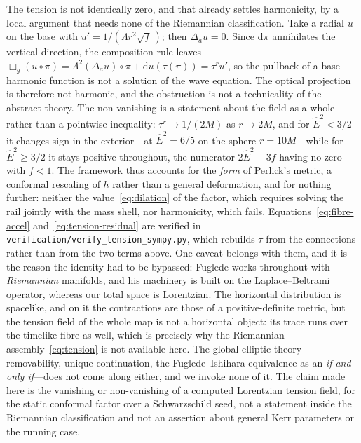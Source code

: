 \documentclass[12pt]{iopart}
\theoremstyle{plain}
\theoremstyle{definition}
\theoremstyle{remark}
\newcommand{\Ehat}{\hat E}
\newcommand{\dd}{\mathrm{d}}
\begin{document}
The tension is not identically zero, and that already settles harmonicity, by a
local argument that needs none of the Riemannian classification. Take a radial $u$
on the base with $u'=1/(\Lambda r^2\sqrt f\,)$; then $\Delta_au=0$. Since
$\dd\pi$ annihilates the vertical direction, the composition rule leaves
$\Box_g(u\circ\pi)=\Lambda^2(\Delta_au)\circ\pi+\dd u(\tau(\pi))=\tau^r u'$, so the
pullback of a base-harmonic function is not a solution of the wave equation. The
optical projection is therefore not harmonic, and the obstruction is not a
technicality of the abstract theory. The non-vanishing is a statement about the
field as a whole rather than a pointwise inequality: $\tau^r\to1/(2M)$ as $r\to2M$,
and for $\Ehat^2<3/2$ it changes sign in the exterior---at $\Ehat^2=6/5$ on the
sphere $r=10M$---while for $\Ehat^2\ge3/2$ it stays positive throughout, the
numerator $2\Ehat^2-3f$ having no zero with $f<1$. The framework thus accounts for
the \emph{form} of
Perlick's metric, a conformal rescaling of $h$ rather than a general deformation,
and for nothing further: neither the value~\eqref{eq:dilation} of the factor, which
requires solving the rail jointly with the mass shell, nor harmonicity, which fails.
Equations~\eqref{eq:fibre-accel} and~\eqref{eq:tension-residual} are verified in
\texttt{verification/verify\_tension\_sympy.py}, which rebuilds $\tau$ from the
connections rather than from the two terms above.
One caveat belongs with them, and it is the reason the identity had to be bypassed:
Fuglede works throughout with \emph{Riemannian} manifolds, and his machinery is
built on the Laplace--Beltrami operator, whereas our total space is Lorentzian. The
horizontal distribution is spacelike, and on it the contractions are those of a
positive-definite metric, but the tension field of the whole map is not a horizontal
object: its trace runs over the timelike fibre as well, which is precisely why the
Riemannian assembly~\eqref{eq:tension} is not available here. The global elliptic
theory---removability, unique continuation, the Fuglede--Ishihara equivalence as an
\emph{if and only if}---does not come along either, and we invoke none of it. The
claim made here is the vanishing or non-vanishing of a computed Lorentzian tension
field, for the static conformal factor over a Schwarzschild seed, not a statement
inside the Riemannian classification and not an assertion about general Kerr
parameters or the running case.
\end{document}
